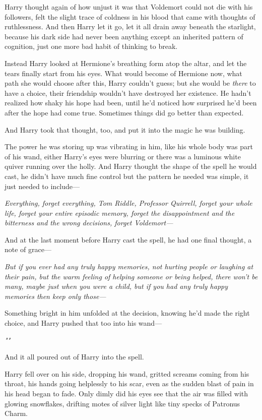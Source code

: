Harry thought again of how unjust it was that Voldemort could not die with his
followers, felt the slight trace of coldness in his blood that came with
thoughts of ruthlessness. And then Harry let it go, let it all drain away
beneath the starlight, because his dark side had never been anything except an
inherited pattern of cognition, just one more bad habit of thinking to break.

Instead Harry looked at Hermione's breathing form atop the altar, and let the
tears finally start from his eyes. What would become of Hermione now, what path
she would choose after this, Harry couldn't guess; but she would be
\emph{there} to have a choice, their friendship wouldn't have destroyed her
existence. He hadn't realized how shaky his hope had been, until he'd noticed
how surprised he'd been after the hope had come true. Sometimes things did go
better than expected.

And Harry took that thought, too, and put it into the magic he was building.

The power he was storing up was vibrating in him, like his whole body was part
of his wand, either Harry's eyes were blurring or there was a luminous white
quiver running over the holly. And Harry thought the shape of the spell he
would cast, he didn't have much fine control but the pattern he needed was
simple, it just needed to include\mbox{---}

\emph{Everything, forget everything, Tom Riddle, Professor Quirrell, forget
your whole life, forget your entire episodic memory, forget the disappointment
and the bitterness and the wrong decisions, forget Voldemort---}

And at the last moment before Harry cast the spell, he had one final thought, a
note of grace\mbox{---}

\emph{But if you ever had any truly happy memories, not hurting people or
laughing at their pain, but the warm feeling of helping someone or being
helped, there won't be many, maybe just when you were a child, but if you had
any truly happy memories then keep only those---}

Something bright in him unfolded at the decision, knowing he'd made the right
choice, and Harry pushed that too into his wand\mbox{---}

\emph{"\textbf{}"}

And it all poured out of Harry into the spell.

Harry fell over on his side, dropping his wand, gritted screams coming from his
throat, his hands going helplessly to his scar, even as the sudden blast of
pain in his head began to fade. Only dimly did his eyes see that the air was
filled with glowing snowflakes, drifting motes of silver light like tiny specks
of Patronus Charm.

